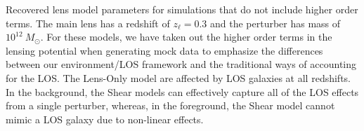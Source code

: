 \label{fig:frontback} Recovered lens model parameters for simulations that do not include higher order terms. The main lens has a redshift of $z_\ell = 0.3$ and the perturber has mass of $10^{12}~ M_\odot$. For these models, we have taken out the higher order terms in the lensing potential when generating mock data to emphasize the differences between our environment/LOS framework and the traditional ways of accounting for the LOS. The Lens-Only model are affected by LOS galaxies at all redshifts. In the background, the Shear models can effectively capture all of the LOS effects from a single perturber, whereas, in the foreground, the Shear model cannot mimic a LOS galaxy due to non-linear effects.